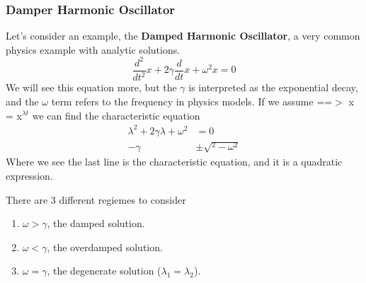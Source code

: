 \documentclass{article}
\newcommand{\be}{\begin{equation}}
\newcommand{\ee}{\end{equation}}
\newcommand{\benum}{\begin{enumerate}}
\newcommand{\eenum}{\end{enumerate}}
\begin{document}
\subsubsection*{Damper Harmonic Oscillator}
Let's consider an example, the \textbf{Damped Harmonic Oscillator}, a very common physics example with analytic solutions.
\be
\frac{d^2}{dt^2} x + 2\gamma \frac{d}{dt} x + \omega^2 x = 0
\ee
We will see this equation more, but the $\gamma$ is interpreted as the exponential decay, and the $\omega$ term refers to the frequency in physics models.
If we assume ==$>$ x = x$^{\lambda t}$ we can find the characteristic equation
\be
\begin{split}
\lambda^2 + 2\gamma\lambda  + \omega^2 &= 0\\
-\gamma & \pm \sqrt{^2 - \omega^2}
\end{split}
\ee
Where we see the last line is the characteristic equation, and it is a quadratic expression.

There are 3 different regiemes to consider
\benum
\item $\omega > \gamma$, the damped solution.
\item $\omega < \gamma$, the overdamped solution.
\item $\omega = \gamma$, the degenerate solution ($\lambda_1 = \lambda_2$).
\eenum

\end{document}
